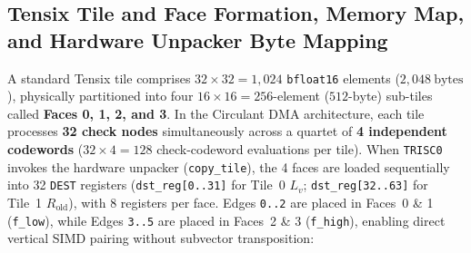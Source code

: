 \documentclass[10pt]{article}
\begin{document}
\subsection{Tensix Tile and Face Formation, Memory Map, and Hardware Unpacker Byte Mapping}

A standard Tensix tile comprises $32 \times 32 = 1,024$ \texttt{bfloat16} elements ($2,048\ \mathrm{bytes}$), physically partitioned into four $16 \times 16 = 256$-element ($512\text{-byte}$) sub-tiles called \textbf{Faces 0, 1, 2, and 3}. In the Circulant DMA architecture, each tile processes \textbf{32 check nodes} simultaneously across a quartet of \textbf{4 independent codewords} ($32 \times 4 = 128$ check-codeword evaluations per tile). When \texttt{TRISC0} invokes the hardware unpacker (\texttt{copy\_tile}), the 4 faces are loaded sequentially into 32 \texttt{DEST} registers (\texttt{dst\_reg[0..31]} for Tile~0 $L_v$; \texttt{dst\_reg[32..63]} for Tile~1 $R_{\mathrm{old}}$), with 8 registers per face. Edges \texttt{0..2} are placed in Faces~0 \& 1 (\texttt{f\_low}), while Edges \texttt{3..5} are placed in Faces~2 \& 3 (\texttt{f\_high}), enabling direct vertical SIMD pairing without subvector transposition:
\end{document}
